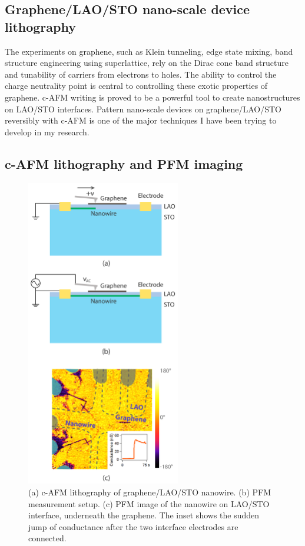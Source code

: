 \documentclass[pdflatex, sectionletters, 12pt]{pittetd}    %
\begin{document}
\subsection{Graphene/LAO/STO nano-scale device lithography}

The experiments on graphene, such as Klein tunneling\cite{allain2011klein, katsnelson2006chiral, young2009quantum, shytov2008klein}, edge state mixing\cite{williams2007quantum, abanin2007quantized, lohmann2009four, amet2014selective}, band structure engineering using superlattice\cite{forsythe2018band}, rely on the Dirac cone band structure and tunability of carriers from electrons to holes. The ability to control the charge neutrality point is central to controlling these exotic properties of graphene. c-AFM writing is proved to be a powerful tool to create nanostructures on LAO/STO interfaces. Pattern nano-scale devices on graphene/LAO/STO reversibly with c-AFM is one of the major techniques I have been trying to develop in my research. 

\subsection{c-AFM lithography and PFM imaging}
\begin{figure}[p]
	\centering
	\includegraphics[width=0.6\textwidth]{Drawing/GraphenePFM.pdf}
	\caption{(a) c-AFM lithography of graphene/LAO/STO nanowire. (b) PFM measurement setup. (c) PFM image of the nanowire on LAO/STO interface, underneath the graphene. The inset shows the sudden jump of conductance after the two interface electrodes are connected.}
	\label{FIG:GraphenePFM}
\end{figure}
\end{document}
